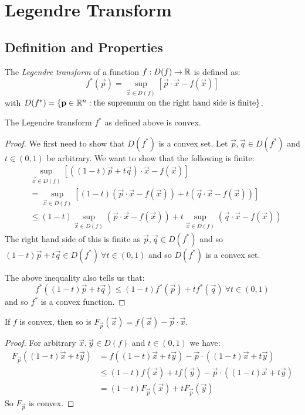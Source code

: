 \documentclass[../main.tex]{subfiles}
\begin{document}
\chapter{Legendre Transform}
\section{Definition and Properties}
\begin{definition}
  The \textit{Legendre transform} of a function $f: D(f) \to \mathbb{R}$ is defined as:
  \[
    f^{*}(\vec{p}) = \sup_{\vec{x} \in D(f)}  [\vec{p} \cdot \vec{x} - f(\vec{x})]
  \]
  with $D(f^{*}) = \{\mathbf{\bm{p}} \in \mathbb{R}^{n}: \text{the supremum on the right hand side is finite}\}$.
\end{definition}
\begin{lemma}
  The Legendre transform $f^{*}$ as defined above is convex. \label{legendreConvex}
\end{lemma}
\begin{proof}
  We first need to show that $D(f^{*})$ is a convex set.
  Let $\vec{p}, \vec{q} \in D(f^{*})$ and $t \in (0, 1)$ be arbitrary.
  We want to show that the following is finite:
  \begin{align*}
    &\sup_{\vec{x} \in D(f)} [((1 - t)\vec{p} + t\vec{q})\cdot \vec{x} - f(\vec{x})] \\
    &= \sup_{\vec{x} \in D(f)} [(1 - t)(\vec{p}\cdot \vec{x} - f(\vec{x})) + t(\vec{q} \cdot \vec{x} - f(\vec{x}))] \\
    &\leq (1 - t) \sup_{\vec{x} \in D(f)} (\vec{p} \cdot \vec{x} - f(\vec{x})) + t \sup_{\vec{x} \in D(f)} (\vec{q} \cdot \vec{x} - f(\vec{x}))
  \end{align*}
  The right hand side of this is finite as $\vec{p}, \vec{q} \in D(f^{*})$ and so $(1 - t)\vec{p} + t\vec{q} \in D(f^{*})\ \forall t \in (0, 1)$ and so $D(f^{*})$ is a convex set.

  The above inequality also tells us that:
  \[
    f^{*}((1 - t)\vec{p} + t\vec{q}) \leq (1 - t) f^{*}(\vec{p}) + t f^{*}(\vec{q})\ \forall t \in (0, 1)
  \]
  and so $f^{*}$ is a convex function.
\end{proof}
\begin{proposition}
  If $f$ is convex, then so is $F_{\vec{p}}(\vec{x}) = f(\vec{x}) - \vec{p} \cdot \vec{x}$.
\end{proposition}
\begin{proof}
  For arbitrary $\vec{x}, \vec{y} \in D(f)$ and $t \in (0, 1)$ we have:
  \begin{align*}
    F_\vec{p}((1 - t)\vec{x} + t\vec{y}) &= f((1 - t)\vec{x} + t\vec{y}) - \vec{p} \cdot ((1 - t)\vec{x} + t\vec{y}) \\
                                         &\leq (1 - t)f(\vec{x}) + t f(\vec{y}) - \vec{p} \cdot ((1 - t)\vec{x} + t\vec{y}) \\
                                         &= (1 - t)F_\vec{p}(\vec{x}) + tF_{\vec{p}}(\vec{y})
  \end{align*}
  So $F_{\vec{p}}$ is convex.
\end{proof}
\end{document}
